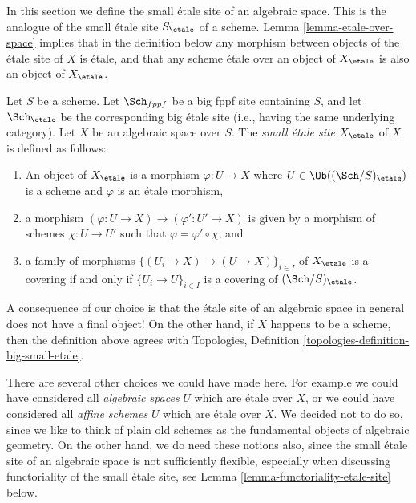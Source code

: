\noindent
In this section we define the small \'etale site of an algebraic space.
This is the analogue of the small \'etale site $S_\etale$ of a scheme.
Lemma \ref{lemma-etale-over-space} implies that in the definition below
any morphism between objects of the \'etale site of $X$ is \'etale, and that
any scheme \'etale over an object of $X_\etale$ is also an object of
$X_\etale$.

\begin{definition}
\label{definition-etale-site}
Let $S$ be a scheme.
Let $\Sch_{fppf}$ be a big fppf site containing $S$,
and let $\Sch_\etale$ be the corresponding big \'etale site
(i.e., having the same underlying category).
Let $X$ be an algebraic space over $S$.
The {\it small \'etale site $X_\etale$} of $X$ is defined as follows:
\begin{enumerate}
\item An object of $X_\etale$ is a morphism $\varphi : U \to X$
where $U \in \Ob((\Sch/S)_\etale)$ is a scheme and
$\varphi$ is an \'etale morphism,
\item a morphism $(\varphi : U \to X) \to (\varphi' : U' \to X)$
is given by a morphism of schemes $\chi : U \to U'$ such that
$\varphi = \varphi' \circ \chi$, and
\item a family of morphisms $\{(U_i \to X) \to (U \to X)\}_{i \in I}$
of $X_\etale$ is a covering if and only if $\{U_i \to U\}_{i \in I}$
is a covering of $(\Sch/S)_\etale$.
\end{enumerate}
\end{definition}

\noindent
A consequence of our choice is that the \'etale site of an algebraic space
in general does not have a final object! On the other hand, if $X$ happens
to be a scheme, then the definition above agrees with
Topologies, Definition \ref{topologies-definition-big-small-etale}.

\medskip\noindent
There are several other choices we could have made here. For example
we could have considered all {\it algebraic spaces} $U$ which are \'etale
over $X$, or we could have considered all {\it affine schemes} $U$ which
are \'etale over $X$. We decided not to do so, since we like to think of
plain old schemes as the fundamental objects of algebraic geometry. On
the other hand, we do need these notions also, since the small \'etale site
of an algebraic space is not sufficiently flexible, especially when
discussing functoriality of the small \'etale site, see
Lemma \ref{lemma-functoriality-etale-site}
below.

